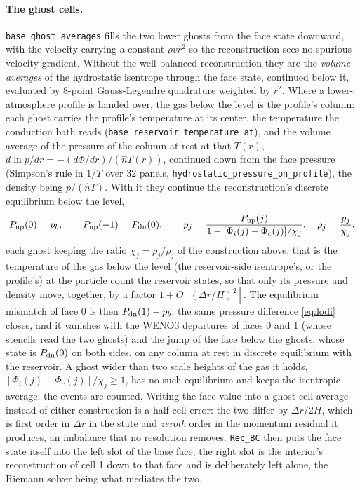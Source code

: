 \paragraph{The ghost cells.}
\texttt{base\_ghost\_averages} fills the two lower ghosts from the face state
downward, with the velocity carrying a constant $\rho v r^2$ so the
reconstruction sees no spurious velocity gradient.  Without the well-balanced
reconstruction they are the \emph{volume averages} of the hydrostatic
isentrope through the face state, continued below it, evaluated by 8-point
Gauss-Legendre quadrature weighted by $r^2$.  Where a lower-atmosphere
profile is handed over, the gas below the level is the profile's column: each
ghost carries the profile's temperature at its center, the temperature the
conduction bath reads (\texttt{base\_reservoir\_temperature\_at}), and the
volume average of the pressure of the column at rest at that $T(r)$,
$d\ln p/dr = -(d\Phi/dr)/(\hat n T(r))$, continued down from the face pressure
(Simpson's rule in $1/T$ over 32 panels, \texttt{hydrostatic\_pressure\_on\_profile}),
the density being $p/(\hat n T)$.  With it they continue the
reconstruction's discrete equilibrium below the level,
%
\begin{equation}
  P_{\rm up}(0) = p_b, \qquad P_{\rm up}(-1) = P_{\rm dn}(0),
  \qquad
  p_j = \frac{P_{\rm up}(j)}{1 - [\Phi_i(j)-\Phi_c(j)]/\chi_j},
  \quad \rho_j = \frac{p_j}{\chi_j},
  \label{eq:ghost_wb}
\end{equation}
%
each ghost keeping the ratio $\chi_j = p_j/\rho_j$ of the construction above,
that is the temperature of the gas below the level (the reservoir-side
isentrope's, or the profile's) at the particle count the reservoir
states, so that only its pressure and density move, together, by a factor
$1 + O[(\Delta r/H)^2]$.  The equilibrium mismatch of face 0 is then
$P_{\rm dn}(1) - p_b$, the same pressure difference \eqref{eq:lodi} closes,
and it vanishes with the WENO3 departures of faces 0 and 1 (whose stencils
read the two ghosts) and the jump of the face below the ghosts, whose state
is $P_{\rm dn}(0)$ on both sides, on any column at rest in discrete
equilibrium with the reservoir.  A ghost wider than two scale heights of the
gas it holds, $[\Phi_i(j)-\Phi_c(j)]/\chi_j \ge 1$, has no such equilibrium
and keeps the isentropic average; the events are counted.  Writing the face
value into a ghost cell average instead of either construction is a half-cell
error: the two differ by $\Delta r/2H$, which is first order in $\Delta r$ in
the state and \emph{zeroth} order in the momentum residual it produces, an
imbalance that no resolution removes.  \texttt{Rec\_BC} then puts the face
state itself into the left slot of the base face; the right slot is the
interior's reconstruction of cell 1 down to that face and is deliberately
left alone, the Riemann solver being what mediates the two.

